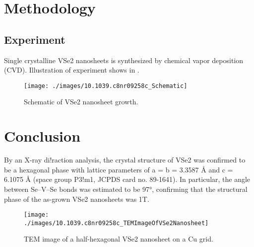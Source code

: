 \section{Methodology}

\subsection{Experiment}
Single crystalline VSe2 nanosheets is synthesized by chemical vapor deposition (CVD). Illustration of experiment shows in .

\begin{figure}[ht] 
    \texttt{[image: ./images/10.1039.c8nr09258c\_Schematic]}
	\caption[Schematic of VSe2 nanosheet growth]{
		Schematic of VSe2 nanosheet growth.
	}
\end{figure}

\section{Conclusion}
By an X-ray di!raction analysis, the crystal structure of VSe2 was confirmed to be a hexagonal phase with lattice parameters of a = b = 3.3587 Å and c = 6.1075 Å (space group P3!m1, JCPDS card no. 89-1641). In particular, the angle between Se–V–Se bonds was estimated to be 97°, confirming that the structural phase of the as-grown VSe2 nanosheets was 1T.
\begin{figure}[ht] 
    \texttt{[image: ./images/10.1039.c8nr09258c\_TEMImageOfVSe2Nanosheet]}
	\caption[TEM image of a half-hexagonal VSe2 nanosheet on a Cu grid]{
		TEM image of a half-hexagonal VSe2 nanosheet on a Cu grid.
	}
\end{figure}

